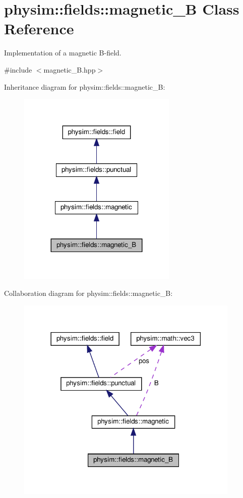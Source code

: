 \hypertarget{classphysim_1_1fields_1_1magnetic__B}{}\section{physim\+:\+:fields\+:\+:magnetic\+\_\+B Class Reference}
\label{classphysim_1_1fields_1_1magnetic__B}


Implementation of a magnetic B-\/field.  




{\ttfamily \#include $<$magnetic\+\_\+\+B.\+hpp$>$}



Inheritance diagram for physim\+:\+:fields\+:\+:magnetic\+\_\+B\+:\nopagebreak
\begin{figure}[H]
\begin{center}
\leavevmode
\includegraphics[width=215pt]{classphysim_1_1fields_1_1magnetic__B__inherit__graph}
\end{center}
\end{figure}


Collaboration diagram for physim\+:\+:fields\+:\+:magnetic\+\_\+B\+:\nopagebreak
\begin{figure}[H]
\begin{center}
\leavevmode
\includegraphics[width=302pt]{classphysim_1_1fields_1_1magnetic__B__coll__graph}
\end{center}
\end{figure}
